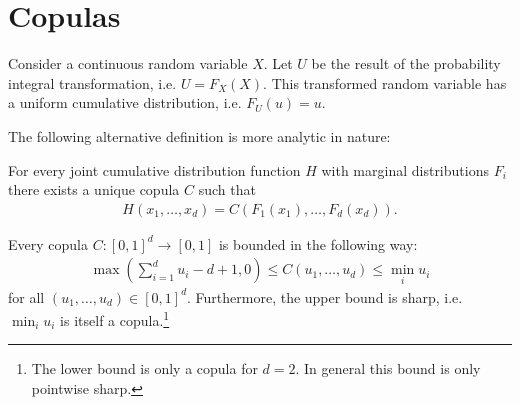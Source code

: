 \section{Copulas}

    \begin{property}
        Consider a continuous random variable $X$. Let $U$ be the result of the probability integral transformation, i.e. $U = F_X(X)$. This transformed random variable has a uniform cumulative distribution, i.e. $F_U(u) = u$.
    \end{property}


    The following alternative definition is more analytic in nature:

    \begin{theorem}[Sklar]
        For every joint cumulative distribution function $H$ with marginal distributions $F_i$ there exists a unique copula $C$ such that
        \begin{gather}
            H(x_1,\ldots,x_d) = C(F_1(x_1),\ldots,F_d(x_d)).
        \end{gather}
    \end{theorem}

    \begin{property}
        Every copula $C:[0,1]^d\rightarrow[0,1]$ is bounded in the following way:
        \begin{gather}
            \max\left(\sum_{i=1}^du_i-d+1, 0\right)\leq C(u_1,\ldots,u_d)\leq \min_iu_i
        \end{gather}
        for all $(u_1, \ldots, u_d)\in[0,1]^d$. Furthermore, the upper bound is sharp, i.e. $\min_iu_i$ is itself a copula.\footnote{The lower bound is only a copula for $d=2$. In general this bound is only pointwise sharp.}
    \end{property}

